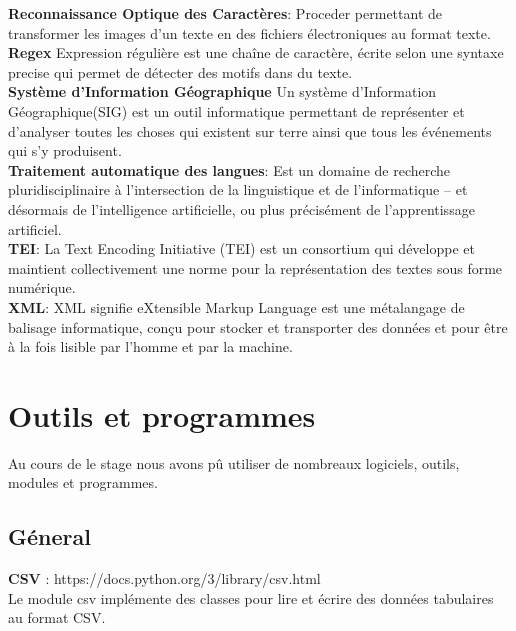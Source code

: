 \documentclass[a4paper,12pt,twoside]{book}
\begin{document}
	\noindent \textbf{Reconnaissance Optique des Caractères}: Proceder permettant de transformer les images d'un texte en des fichiers électroniques au format texte.\\
	
	\noindent \textbf{Regex} Expression régulière est une chaîne de caractère, écrite selon une syntaxe precise qui permet de détecter des motifs dans du texte.\\
	
	\noindent \textbf{Système d’Information Géographique} Un système d’Information Géographique(SIG) est un outil informatique permettant de représenter et d’analyser toutes les choses qui existent sur terre ainsi que tous les événements qui s’y produisent. \\
	
	\noindent \textbf{Traitement automatique des langues}: Est un domaine de recherche pluridisciplinaire à l’intersection de la linguistique et de l’informatique – et désormais de l’intelligence artificielle, ou plus précisément de l’apprentissage artificiel. \\
	
	\noindent \textbf{TEI}: La Text Encoding Initiative (TEI) est un consortium qui développe et maintient collectivement une norme pour la représentation des textes sous forme numérique. \\
	
	\noindent \textbf{XML}: XML signifie eXtensible Markup Language est une métalangage de balisage informatique, conçu pour stocker et transporter des données et pour être à la fois lisible par l'homme et par la machine.
	
	\chapter{Outils et programmes}
	
	Au cours de le stage nous avons pû utiliser de nombreaux logiciels, outils, modules et programmes. 
	
	\section{Géneral}
	
	\noindent \textbf{CSV} : https://docs.python.org/3/library/csv.html \\
	
	Le module csv implémente des classes pour lire et écrire des données tabulaires au format CSV. \\
	
\end{document}
